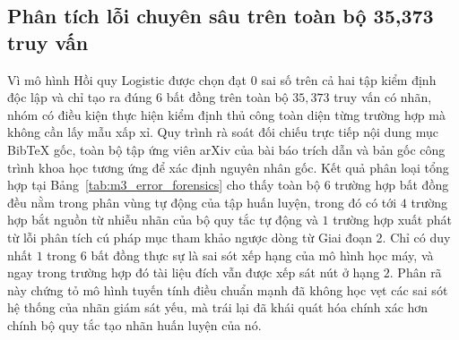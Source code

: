 \subsection{Phân tích lỗi chuyên sâu trên toàn bộ 35{,}373 truy vấn}

Vì mô hình Hồi quy Logistic được chọn đạt $0$ sai số trên cả hai tập kiểm định độc lập và chỉ tạo ra đúng $6$ bất đồng trên toàn bộ $35{,}373$ truy vấn có nhãn, nhóm có điều kiện thực hiện kiểm định thủ công toàn diện từng trường hợp mà không cần lấy mẫu xấp xỉ. Quy trình rà soát đối chiếu trực tiếp nội dung mục BibTeX gốc, toàn bộ tập ứng viên arXiv của bài báo trích dẫn và bản gốc công trình khoa học tương ứng để xác định nguyên nhân gốc. Kết quả phân loại tổng hợp tại Bảng~\ref{tab:m3_error_forensics} cho thấy toàn bộ $6$ trường hợp bất đồng đều nằm trong phân vùng tự động của tập huấn luyện, trong đó có tới $4$ trường hợp bắt nguồn từ nhiễu nhãn của bộ quy tắc tự động và $1$ trường hợp xuất phát từ lỗi phân tích cú pháp mục tham khảo ngược dòng từ Giai đoạn 2. Chỉ có duy nhất $1$ trong $6$ bất đồng thực sự là sai sót xếp hạng của mô hình học máy, và ngay trong trường hợp đó tài liệu đích vẫn được xếp sát nút ở hạng $2$. Phân rã này chứng tỏ mô hình tuyến tính điều chuẩn mạnh đã không học vẹt các sai sót hệ thống của nhãn giám sát yếu, mà trái lại đã khái quát hóa chính xác hơn chính bộ quy tắc tạo nhãn huấn luyện của nó.

